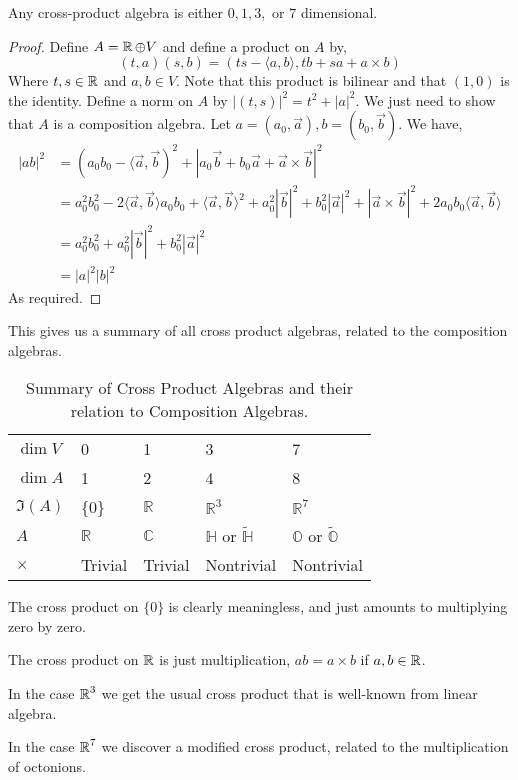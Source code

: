 \begin{cor}
    Any cross-product algebra is either $0,1,3,$ or $7$ dimensional.
\end{cor}
\begin{proof}
    Define $A = \operatorname{\mathbb{R}}\oplus V$ and define a product on $A$ by,
    \[(t,a)(s,b) = (ts-\langle a,b\rangle, tb+sa+a\times b)\]
    Where $t,s\in \operatorname{\mathbb{R}}$ and $a,b\in V$.
    Note that this product is bilinear and that $(1,0)$ is the identity. Define a norm on $A$ by $|(t,s)|^2 = t^2+|a|^2$. We just need to show that $A$ is a composition algebra.  Let $a=(a_0,\vec{a}),b=(b_0,\vec{b})$. We have,
    \begin{align*}
        |ab|^2&=(a_0b_0-\langle \vec{a},\vec{b})^2 + |a_0\vec{b}+b_0\vec{a}+\vec{a}\times\vec{b}|^2\\
        &=a_0^2b_0^2-2\langle\vec{a},\vec{b}\rangle a_0b_0 + \langle\vec{a},\vec{b}\rangle^2 + a_0^2|\vec{b}|^2 + b_0^2|\vec{a}|^2 + |\vec{a}\times\vec{b}|^2 + 2a_0b_0\langle\vec{a},\vec{b}\rangle\\
        &= a_0^2b_0^2 + a_0^2|\vec{b}|^2 + b_0^2|\vec{a}|^2 \\
        &= |a|^2|b|^2
    \end{align*}
    As required.
\end{proof}

This gives us a summary of all cross product algebras, related to the composition algebras.

\begin{table}[h]
\centering
\begin{tabular}{l|llll}
$\dim V$ & 0            & 1            & 3                                    & 7                                    \\
$\dim A$ & 1            & 2            & 4                                    & 8                                    \\
$\Im(A)$ & \{0\}        & $\mathbb{R}$ & $\mathbb{R}^3$                       & $\mathbb{R}^7$                       \\
$A$      & $\mathbb{R}$ & $\mathbb{C}$ & $\mathbb{H}$ or $\tilde{\mathbb{H}}$ & $\mathbb{O}$ or $\tilde{\mathbb{O}}$ \\
$\times$ & Trivial      & Trivial      & Nontrivial                           & Nontrivial                          
\end{tabular}
\caption{Summary of Cross Product Algebras and their relation to Composition Algebras.}
\end{table}
\begin{example}
The cross product on $\{0\}$ is clearly meaningless, and just amounts to multiplying zero by zero.

The cross product on $\operatorname{\mathbb{R}}$ is just multiplication, $ab = a\times b$ if $a,b\in \operatorname{\mathbb{R}}$.

In the case $\operatorname{\mathbb{R}}^3$ we get the usual cross product that is well-known from linear algebra.

In the case $\operatorname{\mathbb{R}}^7$ we discover a modified cross product, related to the multiplication of octonions.
\end{example}
